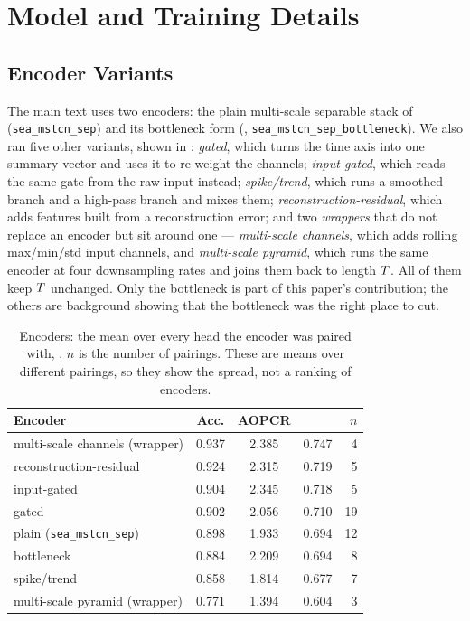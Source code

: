 \section{Model and Training Details}

\subsection{Encoder Variants}
\label{app:encoders}

The main text uses two encoders: the plain multi-scale separable stack of 
(\texttt{sea\_mstcn\_sep}) and its bottleneck form (,
\texttt{sea\_mstcn\_sep\_bottleneck}). We also ran five other variants, shown in
: \emph{gated}, which turns the time axis into one summary vector and uses it
to re-weight the channels; \emph{input-gated}, which reads the same gate from the raw input instead;
\emph{spike/trend}, which runs a smoothed branch and a high-pass branch and mixes them;
\emph{reconstruction-residual}, which adds features built from a reconstruction error; and two
\emph{wrappers} that do not replace an encoder but sit around one --- \emph{multi-scale channels},
which adds rolling max/min/std input channels, and \emph{multi-scale pyramid}, which runs the same
encoder at four downsampling rates and joins them back to length $T$. All of them keep
$T$ unchanged. Only the bottleneck is part of this paper's contribution; the others are
background showing that the bottleneck was the right place to cut.

\begin{table}[h]
\caption{Encoders: the mean over every head the encoder was paired with, \webtraffic{}. $n$ is the
number of pairings. These are means over different pairings, so they show the spread, not a ranking
of encoders.}
\label{tab:app_encoders}
\begin{center}
\small
\begin{tabular}{lcccr}
\toprule
\textbf{Encoder} & Acc. & AOPCR & \ndcg{} & $n$ \\
\midrule
multi-scale channels (wrapper)   & 0.937 & 2.385 & 0.747 & 4 \\
reconstruction-residual          & 0.924 & 2.315 & 0.719 & 5 \\
input-gated                      & 0.904 & 2.345 & 0.718 & 5 \\
gated                            & 0.902 & 2.056 & 0.710 & 19 \\
plain (\texttt{sea\_mstcn\_sep}) & 0.898 & 1.933 & 0.694 & 12 \\
bottleneck                       & 0.884 & 2.209 & 0.694 & 8 \\
spike/trend                      & 0.858 & 1.814 & 0.677 & 7 \\
multi-scale pyramid (wrapper)    & 0.771 & 1.394 & 0.604 & 3 \\
\bottomrule
\end{tabular}
\end{center}
\end{table}

